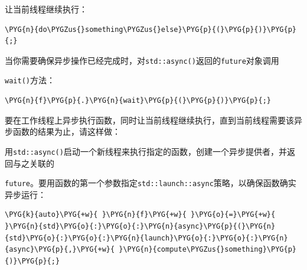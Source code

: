 
让当前线程继续执行：



\begin{codeblockbg}
\begin{Verbatim}[commandchars=\\\{\},breaklines=true,breakanywhere=true,fontsize=\codefont,xleftmargin=17bp]
\PYG{n}{do\PYGZus{}something\PYGZus{}else}\PYG{p}{(}\PYG{p}{)}\PYG{p}{;}
\end{Verbatim}
\end{codeblockbg}



当你需要确保异步操作已经完成时，对\texttt{std::\allowbreak{}async()}返回的\texttt{future}对象调用



\texttt{wait()}方法：



\begin{codeblockbg}
\begin{Verbatim}[commandchars=\\\{\},breaklines=true,breakanywhere=true,fontsize=\codefont,xleftmargin=17bp]
\PYG{n}{f}\PYG{p}{.}\PYG{n}{wait}\PYG{p}{(}\PYG{p}{)}\PYG{p}{;}
\end{Verbatim}
\end{codeblockbg}



要在工作线程上异步执行函数，同时让当前线程继续执行，直到当前线程需要该异步函数的结果为止，请这样做：



用\texttt{std::\allowbreak{}async()}启动一个新线程来执行指定的函数，创建一个异步提供者，并返回与之关联的



\texttt{future}。要用函数的第一个参数指定\texttt{std::\allowbreak{}launch::\allowbreak{}async}策略，以确保函数确实异步运行：



\begin{codeblockbg}
\begin{Verbatim}[commandchars=\\\{\},breaklines=true,breakanywhere=true,fontsize=\codefont,xleftmargin=17bp]
\PYG{k}{auto}\PYG{+w}{ }\PYG{n}{f}\PYG{+w}{ }\PYG{o}{=}\PYG{+w}{ }\PYG{n}{std}\PYG{o}{:}\PYG{o}{:}\PYG{n}{async}\PYG{p}{(}\PYG{n}{std}\PYG{o}{:}\PYG{o}{:}\PYG{n}{launch}\PYG{o}{:}\PYG{o}{:}\PYG{n}{async}\PYG{p}{,}\PYG{+w}{ }\PYG{n}{compute\PYGZus{}something}\PYG{p}{)}\PYG{p}{;}
\end{Verbatim}
\end{codeblockbg}


